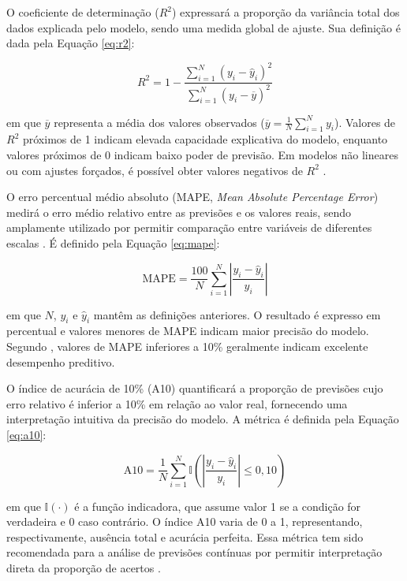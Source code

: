 O coeficiente de determinação ($R^2$) expressará a proporção da variância total dos dados explicada pelo modelo, sendo uma medida global de ajuste. Sua definição é dada pela Equação \eqref{eq:r2}:

\begin{equation}
R^2 = 1 - \frac{ \sum_{i=1}^{N} (y_i - \hat y_i)^2 }{ \sum_{i=1}^{N} (y_i - \overline{y})^2 }
\label{eq:r2}
\end{equation}

em que $\overline{y}$ representa a média dos valores observados ($\overline{y} = \frac{1}{N}\sum_{i=1}^{N} y_i$). Valores de $R^2$ próximos de 1 indicam elevada capacidade explicativa do modelo, enquanto valores próximos de 0 indicam baixo poder de previsão. Em modelos não lineares ou com ajustes forçados, é possível obter valores negativos de $R^2$ \cite{montgomery_design_2020, nguyen_prediction_2022}.

O erro percentual médio absoluto (MAPE, \textit{Mean Absolute Percentage Error}) medirá o erro médio relativo entre as previsões e os valores reais, sendo amplamente utilizado por permitir comparação entre variáveis de diferentes escalas \cite{nguyen_prediction_2022}. É definido pela Equação \eqref{eq:mape}:

\begin{equation}
\mathrm{MAPE} = \frac{100}{N} \sum_{i=1}^{N} \left| \frac{y_i - \hat{y}_i}{y_i} \right|
\label{eq:mape}
\end{equation}

em que $N$, $y_i$ e $\hat{y}_i$ mantêm as definições anteriores. O resultado é expresso em percentual e valores menores de MAPE indicam maior precisão do modelo. Segundo \textcite{de_myttenaere_mean_2016}, valores de MAPE inferiores a 10\% geralmente indicam excelente desempenho preditivo.

O índice de acurácia de 10\% (A10) quantificará a proporção de previsões cujo erro relativo é inferior a 10\% em relação ao valor real, fornecendo uma interpretação intuitiva da precisão do modelo. A métrica é definida pela Equação \eqref{eq:a10}:

\begin{equation}
\mathrm{A10} = \frac{1}{N} \sum_{i=1}^{N} \mathbb{I}\left( \left| \frac{y_i - \hat{y}_i}{y_i} \right| \le 0{,}10 \right)
\label{eq:a10}
\end{equation}

em que $\mathbb{I}(\cdot)$ é a função indicadora, que assume valor 1 se a condição for verdadeira e 0 caso contrário. O índice A10 varia de 0 a 1, representando, respectivamente, ausência total e acurácia perfeita. Essa métrica tem sido recomendada para a análise de previsões contínuas por permitir interpretação direta da proporção de acertos \cite{nguyen_prediction_2022}.


